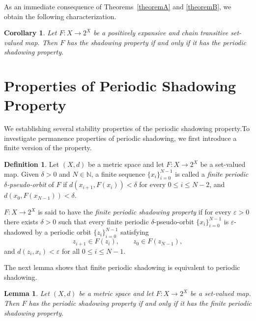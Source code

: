 \documentclass{amsart}
\newtheorem{corollary}[theorem]{Corollary}
\newtheorem{lemma}[theorem]{Lemma}
\theoremstyle{definition}
\newtheorem{definition}[theorem]{Definition}
\begin{document}
As an immediate consequence of Theorems~\ref{theoremA} and \ref{theoremB}, we obtain the following characterization.

\begin{corollary}
Let $F:X\to 2^X$ be a positively expansive and chain transitive set-valued map. Then $F$ has the shadowing property if and only if it has the periodic shadowing property.
\end{corollary}


\section{Properties of Periodic Shadowing Property}

We establishing several stability properties of the periodic shadowing property.To investigate permanence properties of periodic shadowing, we first introduce a finite version of the property.

\begin{definition}
Let $(X,d)$ be a metric space and let $F:X\to 2^X$ be a set-valued map. Given $\delta>0$ and $N\in\mathbb N$, a finite sequence $\{x_i\}_{i=0}^{N-1}$ is called a \emph{finite periodic $\delta$-pseudo-orbit} of $F$ if $
d(x_{i+1},F(x_i))<\delta$ for every $0\leq i\leq N-2$, and $d(x_0,F(x_{N-1}))<\delta$. 

$F:X\to 2^X$ is said to have the \emph{finite periodic shadowing property} if for every $\varepsilon>0$ there exists $\delta>0$ such that every finite periodic $\delta$-pseudo-orbit $\{x_i\}_{i=0}^{N-1}$ is $\varepsilon$-shadowed by a periodic orbit $\{z_i\}_{i=0}^{N-1}$ satisfying 
\[
z_{i+1}\in F(z_i),
\qquad
z_0\in F(z_{N-1}),
\]
and $d(z_i,x_i)<\varepsilon$ for all $0\leq i\leq N-1$.
\end{definition}

The next lemma shows that finite periodic shadowing is equivalent to periodic shadowing.

\begin{lemma}
\label{finitePSP}
Let $(X,d)$ be a metric space and let $F:X\to 2^X$ be a set-valued map. Then $F$ has the periodic shadowing property if and only if it has the finite periodic shadowing property.
\end{lemma}
\end{document}
